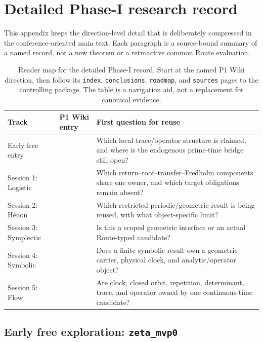 \appendix
\section{Detailed Phase-I research record}
\label{app:record}

This appendix keeps the direction-level detail that is deliberately compressed
in the conference-oriented main text. Each paragraph is a source-bound summary
of a named record, not a new theorem or a retroactive common Route evaluation.

\begin{table}[tbp]
\centering
\caption{Reader map for the detailed Phase-I record. Start at the named P1
Wiki direction, then follow its \texttt{index}, \texttt{conclusions},
\texttt{roadmap}, and \texttt{sources} pages to the controlling package. The
table is a navigation aid, not a replacement for canonical evidence.}
\label{tab:reader-map}
\small
\begin{tabularx}{\linewidth}{@{}p{.20\linewidth}p{.35\linewidth}Y@{}}
\toprule
\textbf{Track} & \textbf{P1 Wiki entry} & \textbf{First question for reuse} \\
\midrule
Early free entry &  & Which local trace/operator
structure is claimed, and where is the endogenous prime-time bridge still open? \\
Session 1: Logistic &  & Which
return--roof--transfer--Fredholm components share one owner, and which target
obligations remain absent? \\
Session 2: H\'{e}non &  & Which restricted
periodic/geometric result is being reused, with what object-specific limit? \\
Session 3: Symplectic &  & Is this a scoped
geometric interface or an actual Route-typed candidate? \\
Session 4: Symbolic &  & Does a finite
symbolic result own a geometric carrier, physical clock, and analytic/operator
object? \\
Session 5: Flow &  & Are clock, closed orbit,
repetition, determinant, trace, and operator owned by one continuous-time
candidate? \\
\bottomrule
\end{tabularx}
\end{table}

\subsection{Early free exploration: \texttt{zeta\_mvp0}}

